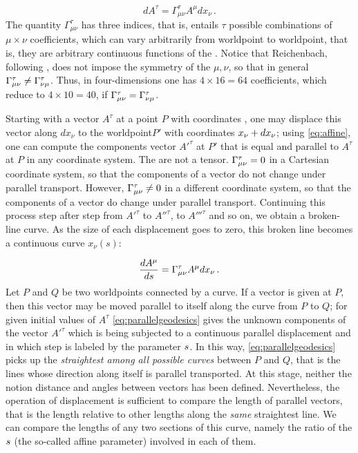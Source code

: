 \documentclass[submitted]{article}
\newcommand{\wpo}{worldpoint\xspace}
\begin{document}
\begin{equation}\label{eq:affine}
dA^\tau = \Gamma^\tau_{\mu\nu}A^{\mu} dx_\nu\,.
\end{equation}
%
The quantity $\Gamma^\tau_{\mu\nu}$ has three indices, that is, entails $\tau$ possible combinations of $\mu \times \nu$ coefficients, which can vary arbitrarily from \wpo to \wpo, that is, they are arbitrary continuous functions of the \xn. Notice that Reichenbach, following \citet{Schouten1922a}, does not impose the symmetry of the $\mu,\nu$, so that in general $\Gamma^\tau_{\mu\nu} \neq \Gamma^\tau_{\nu\mu}$. Thus, in four-dimensions one has $4 \times 16 = 64$ coefficients, which reduce to $4 \times 10 = 40$, if $\Gamma^\tau_{\mu\nu} = \Gamma^\tau_{\nu\mu}$.

Starting with a vector $A^\tau$ at a point $P$ with coordinates \xn, one may displace this vector along $dx_\nu$ to the \wpo $P'$ with coordinates $x_{\nu}+dx_\nu$; using \cref{eq:affine}, one can compute the components vector $A'^\tau$ at $P'$ that is equal and parallel to $A^\tau$ at $P$ in any coordinate system. The \Gtmn are not a tensor. $\Gamma^\tau_{\mu\nu}=0$ in a Cartesian coordinate system, so that the components of a vector do not change under parallel transport. However, $\Gamma^\tau_{\mu\nu}\neq0$ in a different coordinate system, so that the components of a vector do change under parallel transport. Continuing this process step after step from $A'^\tau$ to $A''^\tau$, to $A'''^\tau$ and so on, we obtain a broken-line curve. As the size of each displacement goes to zero, this broken line becomes a continuous curve $x_\nu(s)$: 

\begin{equation}\label{eq:parallelgeodesics}
\frac{d {A}^{\mu}}{ds} = \Gamma^\tau_{\mu\nu}A^{\mu} dx_\nu\,. 
\end{equation}
%
Let $P$ and $Q$ be two \wpo{}s connected by a curve. If a vector is given at $P$, then this vector may be moved parallel to itself along the curve from $P$ to $Q$; for given initial values of $A^\tau$ \cref{eq:parallelgeodesics} gives the unknown components of the vector $A'^\tau$ which is being subjected to a continuous parallel displacement and in which step is labeled by the parameter $s$. In this way, \cref{eq:parallelgeodesics} picks up the \emph{straightest among all possible curves} between $P$ and $Q$, that is the lines whose direction along itself is parallel transported. At this stage, neither the notion distance and angles between vectors has been defined. Nevertheless, the operation of displacement is sufficient to compare the length of parallel vectors, that is the length relative to other lengths along the \emph{same} straightest line. We can compare the lengths of any two sections of this curve, namely the ratio of the  $s$ (the so-called affine parameter) involved in each of them.
\end{document}
